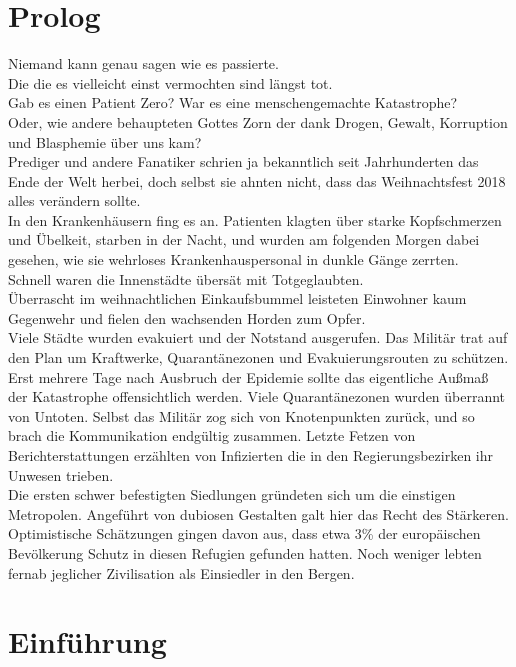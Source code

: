 \section{Prolog}

Niemand kann genau sagen wie es passierte.
\\Die die es vielleicht einst vermochten sind längst tot.
\\Gab es einen Patient Zero? War es eine menschengemachte Katastrophe?
\\Oder, wie andere behaupteten Gottes Zorn der dank Drogen, Gewalt, Korruption und Blasphemie über uns kam?
\\Prediger und andere Fanatiker schrien ja bekanntlich seit Jahrhunderten das Ende der Welt herbei, doch selbst sie ahnten nicht, dass das Weihnachtsfest 2018 alles verändern sollte.
\\In den Krankenhäusern fing es an.
Patienten klagten über starke Kopfschmerzen und Übelkeit, starben in der Nacht, und wurden am folgenden Morgen dabei gesehen, wie sie wehrloses Krankenhauspersonal in dunkle Gänge zerrten.
\\Schnell waren die Innenstädte übersät mit Totgeglaubten.
\\Überrascht im weihnachtlichen Einkaufsbummel leisteten Einwohner kaum Gegenwehr und fielen den wachsenden Horden zum Opfer.
\\Viele Städte wurden evakuiert und der Notstand ausgerufen. Das Militär trat auf den Plan um Kraftwerke, Quarantänezonen und Evakuierungsrouten zu schützen.
\\Erst mehrere Tage nach Ausbruch der Epidemie sollte das eigentliche Außmaß der Katastrophe offensichtlich werden. Viele Quarantänezonen wurden überrannt von Untoten. Selbst das Militär zog sich von Knotenpunkten zurück, und so brach die Kommunikation endgültig zusammen. Letzte Fetzen von Berichterstattungen erzählten von Infizierten die in den Regierungsbezirken ihr Unwesen trieben.
\\Die ersten schwer befestigten Siedlungen gründeten sich um die einstigen Metropolen. Angeführt von dubiosen Gestalten galt hier das Recht des Stärkeren.
\\Optimistische Schätzungen gingen davon aus, dass etwa 3\% der europäischen Bevölkerung Schutz in diesen Refugien gefunden hatten. Noch weniger lebten fernab jeglicher Zivilisation als Einsiedler in den Bergen.


\section{Einführung}

